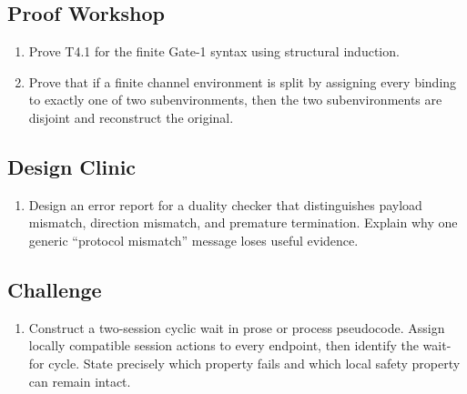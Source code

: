 \subsection*{Proof Workshop}
\begin{enumerate}[label=\textbf{2.\arabic*},start=9]
\item Prove T4.1 for the finite Gate-1 syntax using structural induction.
\item Prove that if a finite channel environment is split by assigning every binding to exactly one
of two subenvironments, then the two subenvironments are disjoint and reconstruct the original.
\end{enumerate}

\subsection*{Design Clinic}
\begin{enumerate}[label=\textbf{2.\arabic*},start=11]
\item Design an error report for a duality checker that distinguishes payload mismatch, direction
mismatch, and premature termination. Explain why one generic ``protocol mismatch'' message loses
useful evidence.
\end{enumerate}

\subsection*{Challenge}
\begin{enumerate}[label=\textbf{2.\arabic*},start=12]
\item Construct a two-session cyclic wait in prose or process pseudocode. Assign locally compatible
session actions to every endpoint, then identify the wait-for cycle. State precisely which property
fails and which local safety property can remain intact.
\end{enumerate}
